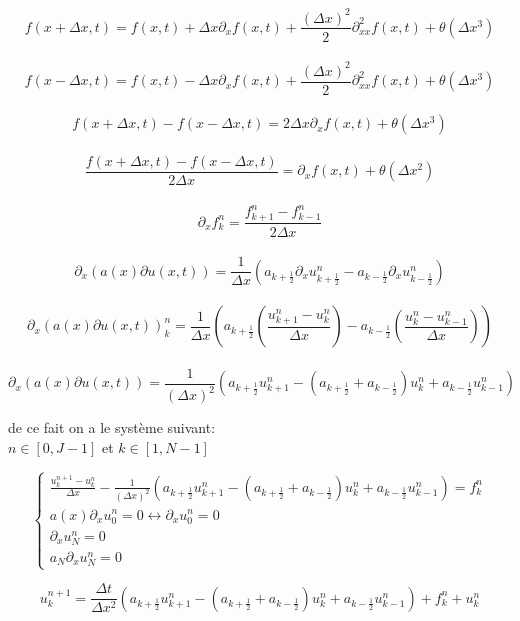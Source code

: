 \documentclass[a4paper,12pt,twoside]{report}
\begin{document}
\smallbreak

$$f(x + \Delta x, t) = f(x,t) + \Delta x \partial_x f(x,t) + \frac{(\Delta x)^2}{2} \partial_{xx} ^2 f(x,t) + \theta (\Delta x^3) $$ \\

$$f(x - \Delta x, t) = f(x,t) - \Delta x \partial_x f(x,t) + \frac{(\Delta x)^2}{2} \partial_{xx} ^2 f(x,t) + \theta (\Delta x^3) $$ \\

$$f(x + \Delta x, t) -f(x - \Delta x, t) = 2 \Delta x \partial_x f(x,t) + \theta (\Delta x^3) $$ \\
$$\frac{f(x + \Delta x, t) -f(x - \Delta x, t)}{2 \Delta x} = \partial_x f(x,t) + \theta (\Delta x^2)$$ \\
$$\partial_x f_k ^n = \frac{f_{k+1} ^n - f_{k-1} ^n}{2 \Delta x}$$ \\

$$ \partial_x(a(x) \partial u(x,t)) = \frac{1}{ \Delta x}(a_{k+\frac{1}{2}} \partial_x u_{k+\frac{1}{2}} ^n - a_{k-\frac{1}{2}} \partial_x u_{k-\frac{1}{2}} ^n) $$\\

$$\partial_x(a(x) \partial u(x,t))_k ^n= \frac{1}{ \Delta x} (a_{k+\frac{1}{2}} (\frac{u_{k+1} ^n - u_{k} ^n}{ \Delta x})- a_{k-\frac{1}{2}} (\frac{u_{k} ^n - u_{k-1} ^n}{ \Delta x}))$$ \\

$$\partial_x(a(x) \partial u(x,t))= \frac{1}{( \Delta x)^2} (a_{k+\frac{1}{2}} u_{k+1}^n - 
(a_{k+\frac{1}{2}} +a_{k-\frac{1}{2}}) u_k ^n +
a_{k-\frac{1}{2}}u_{k-1} ^n )$$


de ce fait on a le système suivant: \\

$n \in [0, J-1]$ et $k \in [1, N-1]$

$$ 
\left\{ 
	\begin{array}{ll}
		\frac{u_{k} ^{n+1} - u_{k} ^n}{ \Delta x} - \frac{1}{( \Delta x)^2} (a_{k+\frac{1}{2}} u_{k+1}^n -(a_{k+\frac{1}{2}} +a_{k-\frac{1}{2}}) u_k ^n + a_{k-\frac{1}{2}}u_{k-1} ^n ) = f_k ^n \\
		a(x) \partial_x u_0 ^n = 0 \leftrightarrow \partial_x u_0 ^n = 0  \\
		\partial_x u_N ^n = 0\\
		a_N \partial_x u_N ^n = 0
		
		
	\end{array}
\right. 
$$

$$u_k ^{n+1} = \frac{\Delta t}{ \Delta x ^2} (a_{k+\frac{1}{2}} u_{k+1}^n -(a_{k+\frac{1}{2}} +a_{k-\frac{1}{2}}) u_k ^n + a_{k-\frac{1}{2}}u_{k-1} ^n ) + f_k ^n + u_k ^n$$
\end{document}
